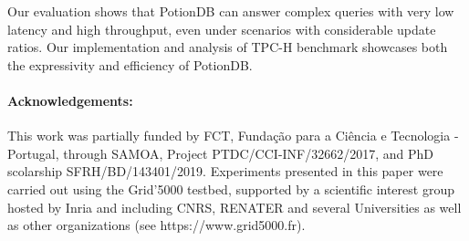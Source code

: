 \documentclass{vldb}
\begin{document}
Our evaluation shows that PotionDB can answer complex queries with very low latency and high throughput, even under scenarios with considerable update ratios.
Our implementation and analysis of TPC-H benchmark showcases both the expressivity and efficiency of PotionDB.

\paragraph{Acknowledgements:} This work was partially funded by FCT, Fundação para a Ciência e Tecnologia - Portugal, through SAMOA, Project PTDC/CCI-INF/32662/2017, and PhD scolarship SFRH/BD/143401/2019.
Experiments presented in this paper were carried out using the Grid'5000 testbed, supported by a scientific interest group hosted by Inria and including CNRS, RENATER and several Universities as well as other organizations (see https://www.grid5000.fr).




\end{document}
